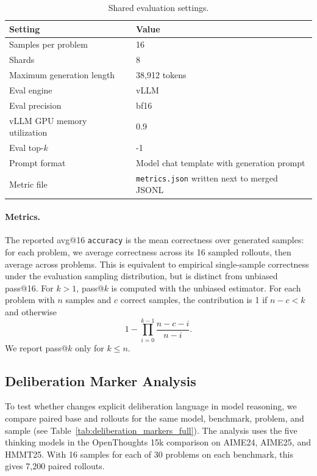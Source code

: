 \begin{table}[!htbp]
    \centering
    \small
    \caption{Shared evaluation settings.}
    \label{tab:eval-shared-hparams}
    \begin{tabular}{ll}
        \toprule
        Setting & Value \\
        \midrule
        Samples per problem & 16 \\
        Shards & 8 \\
        Maximum generation length & 38,912 tokens \\
        Eval engine & vLLM \\
        Eval precision & bf16 \\
        vLLM GPU memory utilization & 0.9 \\
        Eval top-$k$ & -1 \\
        Prompt format & Model chat template with generation prompt \\
        Metric file & \texttt{metrics.json} written next to merged JSONL \\
        \bottomrule
    \end{tabular}
\end{table}

\paragraph{Metrics.}
The reported avg@16 \texttt{accuracy} is the mean correctness over generated
samples: for each problem, we average correctness across its 16 sampled rollouts,
then average across problems. This is equivalent to empirical single-sample
correctness under the evaluation sampling distribution, but is distinct from
unbiased pass@16.
For $k > 1$, pass@$k$ is computed
with the unbiased estimator. For each problem with $n$ samples and $c$ correct
samples, the contribution is 1 if $n-c < k$ and otherwise
\[
1 - \prod_{i=0}^{k-1} \frac{n-c-i}{n-i}.
\]
We report pass@$k$ only for $k \leq n$.

\subsection{Deliberation Marker Analysis}
\label{app:deliberation-markers}

To test whether \opsd{} changes explicit deliberation language in model
reasoning, we compare paired base and \opsd{} rollouts for the same model,
benchmark, problem, and sample (see Table~\ref{tab:deliberation_markers_full}). The analysis uses the five thinking models
in the OpenThoughts 15k comparison on AIME24, AIME25, and HMMT25. With 16
samples for each of 30 problems on each benchmark, this gives 7,200 paired
rollouts.

